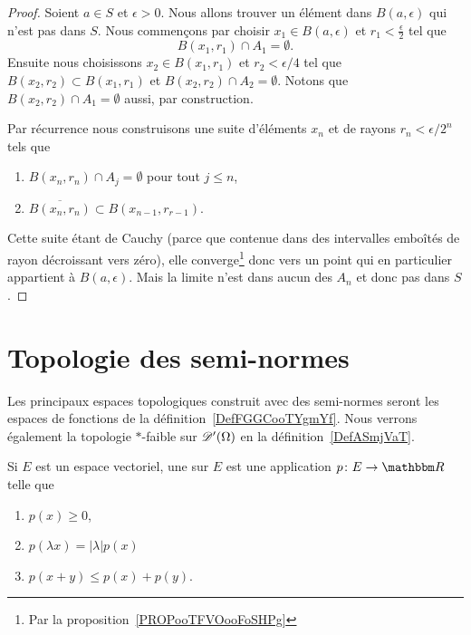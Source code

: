 \begin{proof}
    Soient \( a\in S\) et \( \epsilon>0\). Nous allons trouver un élément dans \( B(a,\epsilon)\) qui n'est pas dans \( S\). Nous commençons par choisir \( x_1\in B(a,\epsilon)\) et \( r_1<\frac{ \epsilon }{2}\) tel que
    \begin{equation}
        B(x_1,r_1)\cap A_1=\emptyset.
    \end{equation}
    Ensuite nous choisissons \( x_2\in B(x_1,r_1)\) et \( r_2<\epsilon/4\) tel que \( B(x_2,r_2)\subset B(x_1,r_1)\) et \( B(x_2,r_2)\cap A_2=\emptyset\). Notons que \( B(x_2,r_2)\cap A_1=\emptyset\) aussi, par construction.

    Par récurrence nous construisons une suite d'éléments \( x_n\) et de rayons \( r_n<\epsilon/2^n\) tels que
    \begin{enumerate}
        \item
            \( B(x_n,r_n)\cap A_j=\emptyset\) pour tout \( j\leq n\),
        \item
            \( \overline{ B(x_n,r_n) }\subset B(x_{n-1},r_{r-1})\).
    \end{enumerate}
    Cette suite étant de Cauchy (parce que contenue dans des intervalles emboîtés de rayon décroissant vers zéro), elle converge\footnote{Par la proposition~\ref{PROPooTFVOooFoSHPg}} donc vers un point qui en particulier appartient à \( B(a,\epsilon)\). Mais la limite n'est dans aucun des \( A_n\) et donc pas dans \( S\).
\end{proof}

\section{Topologie des semi-normes}

Les principaux espaces topologiques construit avec des semi-normes seront les espaces de fonctions de la définition~\ref{DefFGGCooTYgmYf}. Nous verrons également la topologie \( *\)-faible sur \( \mathscr{D}'(\Omega)\) en la définition~\ref{DefASmjVaT}.

\begin{definition}  \label{DefPNXlwmi}
    Si \( E\) est un espace vectoriel, une  sur \( E\) est une application \( p\colon E\to \eR\) telle que
    \begin{enumerate}
        \item
            \( p(x)\geq 0\),
        \item   \label{ItemSHnimhDii}
            \( p(\lambda x)=| \lambda |p(x)\)
        \item   \label{ItemSHnimhDiii}
            \( p(x+y)\leq p(x)+p(y)\).
    \end{enumerate}
\end{definition}

